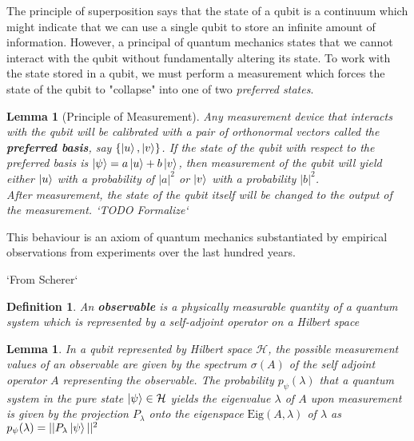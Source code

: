 \documentclass[12pt,twoside]{report}
\newtheorem{defn}[subsection]{Definition}
\newtheorem{lemma}[subsection]{Lemma}
\begin{document}
\iffalse
Like qubits are modelled by $2$-dimensional Hilbert spaces, there could be quantum systems whose states are modelled as vectors in $3$-dimensional vector spaces, these are called \textbf{qutrits}. Similarly, quantum systems whose states are modelled with $n$-dimensional vector spaces are called \textbf{qudits}. A result shows that a system of qutrits or qudits can be reduced to a system of multiple qubits that has similar efficiency, so these systems are rarely used.
\fi

The principle of superposition says that the state of a qubit is a continuum which might indicate that we can use a single qubit to store an infinite amount of information. However, a principal of quantum mechanics states that we cannot interact with the qubit without fundamentally altering its state. To work with the state stored in a qubit, we must perform a measurement which forces the state of the qubit to "collapse" into one of two \textit{preferred states}.

\begin{lemma}[Principle of Measurement]
    Any measurement device that interacts with the qubit will be calibrated with a pair of orthonormal vectors called the \textbf{preferred basis}, say $\{ \ket{u}, \ket{v} \}$. If the state of the qubit with respect to the preferred basis is $\ket{\psi} = a \ket{u} + b \ket{v}$, then measurement of the qubit will yield either $\ket{u}$ with a probability of $|a|^2$ or $\ket{v}$ with a probability $|b|^2$. \\
After measurement, the state of the qubit itself will be changed to the output of the measurement.
`TODO Formalize`
\end{lemma}

This behaviour is an axiom of quantum mechanics substantiated by empirical observations from experiments over the last hundred years.

`From Scherer`
\begin{defn}
    An \textbf{observable} is a physically measurable quantity of a quantum system which is represented by a self-adjoint operator on a Hilbert space
\end{defn}

\begin{lemma}
    In a qubit represented by Hilbert space $\mathcal{H}$, the possible measurement values of an observable are given by the spectrum $\sigma(A)$ of the self adjoint operator $A$ representing the observable.
    The probability $p_\psi(\lambda)$ that a quantum system in the pure state $\ket{\psi} \in \mathcal{H}$ yields the eigenvalue $\lambda$ of $A$ upon measurement is given by the projection $P_\lambda$ onto the eigenspace $\text{Eig}(A, \lambda)$ of $\lambda$ as $p_\psi(\lambda) = || P_\lambda \ket{\psi} ||^2$
\end{lemma}
\end{document}
